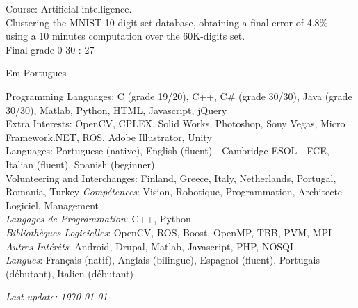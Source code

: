 \documentclass{article}
\begin{document}
\begin{llist}
{ 
Course: Artificial intelligence.\\
Clustering the MNIST 10-digit set database, obtaining a final error of 4.8\%\\
using a 10 minutes computation over the 60K-digits set.\\
Final grade 0-30 : 27

}
{

Em Portugues

}

{
Programming Languages: C (grade 19/20), C++, C\# (grade 30/30), Java (grade 30/30), Matlab, Python, HTML, Javascript, jQuery\\
Extra Interests: OpenCV, CPLEX, Solid Works, Photoshop, Sony Vegas, Micro Framework.NET, ROS, Adobe Illustrator, Unity\\

Languages: Portuguese (native), English (fluent) - Cambridge ESOL - FCE, Italian (fluent), Spanish (beginner)\\
Volunteering and Interchanges: Finland, Greece, Italy, Netherlands, Portugal, Romania, Turkey
}
{
{\em Comp\'{e}tences}: Vision, Robotique, Programmation, Architecte Logiciel, Management\\
{\em Langages de Programmation}: C++, Python\\
{\em Biblioth\`{e}ques Logicielles}: OpenCV, ROS, Boost, OpenMP, TBB, PVM, MPI \\
{\em Autres Int\'{e}r\^{e}ts}: Android, Drupal, Matlab, Javascript, PHP, NOSQL \\
{\em Langues}: Fran\c{c}ais (natif), Anglais (bilingue), Espagnol (fluent), Portugais (d\'{e}butant), Italien
(d\'{e}butant)
}




\end{llist}

{\em Last update: \today}
\end{document}
